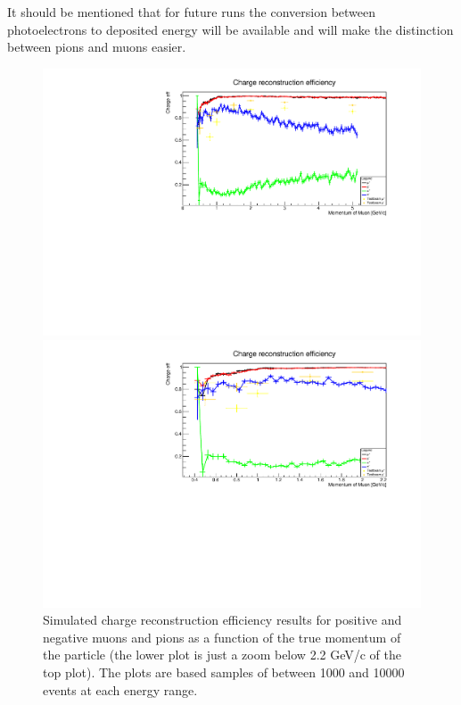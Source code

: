 It should be mentioned that for future runs the conversion between photoelectrons to deposited energy will be available and will make the distinction between pions and muons easier.


\begin{figure}[h!]
\centering
\includegraphics[width=\textwidth]{figures/testbeam/TestBeam090318Plots/ChargeIDFullWPion.pdf}

\includegraphics[width=\textwidth]{figures/testbeam/TestBeam090318Plots/ChargeIDFullLowWPion.pdf}
\caption{Simulated charge reconstruction efficiency results for positive and negative muons and pions as a function of the true momentum of the particle (the lower plot is just a zoom below 2.2 GeV/c of the top plot). The plots are based samples of between 1000 and 10000 events at each energy range.}
\label{fig:ChargeImprovedPion}
\end{figure}

